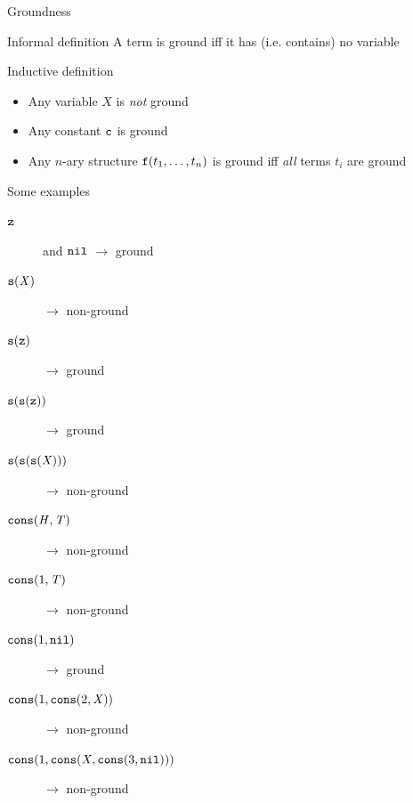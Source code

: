\documentclass[presentation]{beamer}\mode<presentation>{\usetheme{AMSBolognaFC}}
\begin{document}

\begin{frame}[allowframebreaks]{Groundness}
    \begin{block}{Informal definition}\centering
        A term is \alert{ground} iff it has (i.e. contains) no variable
    \end{block}

    \begin{alertblock}{Inductive definition}
        \begin{itemize}
            \item Any variable $X$ is \emph{not} ground
            \item Any constant $\mathtt{c}$ is ground
            \item Any $n$-ary structure $\mathtt{f}(t_1, \ldots, t_n)$ is ground iff \emph{all} terms $t_i$ are ground
        \end{itemize}
    \end{alertblock}

    \begin{exampleblock}{Some examples}
        \begin{description}
            \item[$\mathtt{z}$] and \alert{$\mathtt{nil}$} $\rightarrow$ ground
            \item[$\mathtt{s}(\mathit{X})$] $\rightarrow$ non-ground
            \item[$\mathtt{s}(\mathtt{z})$] $\rightarrow$ ground
            \item[$\mathtt{s}(\mathtt{s}(\mathtt{z}))$] $\rightarrow$ ground
            \item[$\mathtt{s}(\mathtt{s}(\mathtt{s}(\mathit{X})))$] $\rightarrow$ non-ground
            \item[$\mathtt{cons}(\mathit{H}, \mathit{T})$] $\rightarrow$ non-ground
            \item[$\mathtt{cons}(1, \mathit{T})$] $\rightarrow$ non-ground
            \item[$\mathtt{cons}(1, \mathtt{nil})$] $\rightarrow$ ground
            \item[$\mathtt{cons}(1, \mathtt{cons}(2, \mathit{X}))$] $\rightarrow$ non-ground
            \item[$\mathtt{cons}(1, \mathtt{cons}(\mathit{X}, \mathtt{cons}(3, \mathtt{nil})))$] $\rightarrow$ non-ground
        \end{description}
    \end{exampleblock}
\end{frame}
\end{document}
